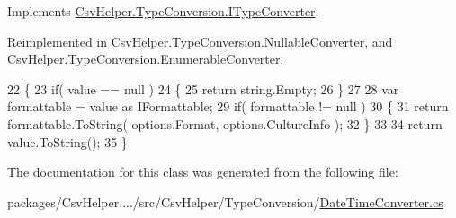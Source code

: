 Implements \hyperlink{a00097_a90c465c63dbcf913f38aa878f35e77c7}{Csv\-Helper.\-Type\-Conversion.\-I\-Type\-Converter}.



Reimplemented in \hyperlink{a00114_a7205cdb61d2d119582958232b3e63109}{Csv\-Helper.\-Type\-Conversion.\-Nullable\-Converter}, and \hyperlink{a00076_a7e07e9532857d748654d37db590a0e11}{Csv\-Helper.\-Type\-Conversion.\-Enumerable\-Converter}.


\begin{DoxyCode}
22         \{
23             \textcolor{keywordflow}{if}( value == null )
24             \{
25                 \textcolor{keywordflow}{return} string.Empty;
26             \}
27 
28             var formattable = value as IFormattable;
29             \textcolor{keywordflow}{if}( formattable != null )
30             \{
31                 \textcolor{keywordflow}{return} formattable.ToString( options.Format, options.CultureInfo );
32             \}
33 
34             \textcolor{keywordflow}{return} value.ToString();
35         \}
\end{DoxyCode}


The documentation for this class was generated from the following file\-:\begin{DoxyCompactItemize}
\item 
packages/\-Csv\-Helper..../src/\-Csv\-Helper/\-Type\-Conversion/\hyperlink{a00224}{Date\-Time\-Converter.\-cs}\end{DoxyCompactItemize}
